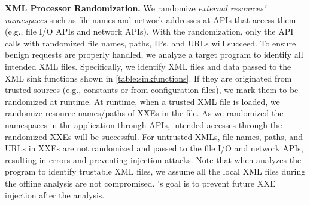 \noindent
{\bf XML Processor Randomization.}
We randomize {\it external resources' namespaces} such as file names and network addresses at APIs that access them (e.g., file I/O APIs and network APIs). With the randomization, only the API calls with randomized file names, paths, IPs, and URLs will succeed. 
To ensure benign requests are properly handled, we analyze a target program to identify all intended XML files. 
Specifically, we identify XML files and data passed to the XML sink functions shown in \autoref{table:sinkfunctions}. If they are originated from trusted sources (e.g., constants or from configuration files), we mark them to be randomized at runtime. 
At runtime, when a trusted XML file is loaded, we randomize resource names/paths of XXEs in the file. 
As we randomized the namespaces in the application through APIs, intended accesses through the randomized XXEs will be successful.
For untrusted XMLs, file names, paths, and URLs in XXEs are not randomized and passed to the file I/O and network APIs, resulting in errors and preventing injection attacks.
%
%
Note that when \sysname analyzes the program to identify trustable XML files, we assume all the local XML files during the offline analysis are not compromised. 
\sysname's goal is to prevent future XXE injection after the analysis. 





